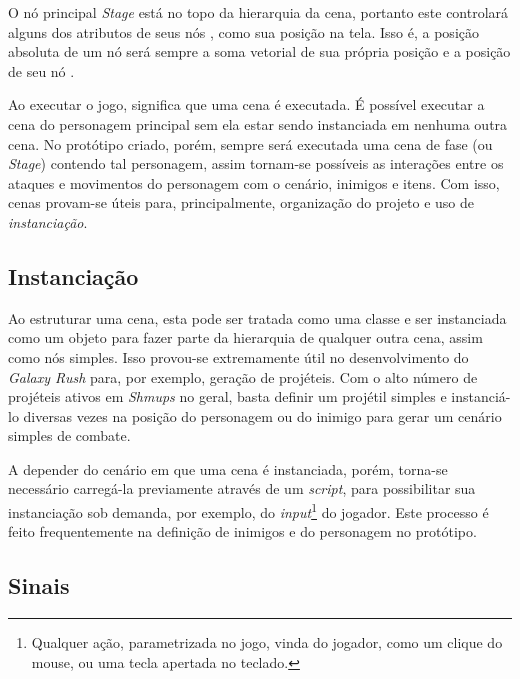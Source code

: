 O nó principal \textit{Stage} está no topo da hierarquia da cena, portanto este controlará alguns dos atributos de seus nós \textquotedbl{}, como sua posição na tela. Isso é, a posição absoluta de um nó será sempre a soma vetorial de sua própria posição e a posição de seu nó \textquotedbl{}.

Ao executar o jogo, significa que uma cena é executada. É possível executar a cena do personagem principal sem ela estar sendo instanciada em nenhuma outra cena. No protótipo criado, porém, sempre será executada uma cena de fase (ou \textit{Stage}) contendo tal personagem, assim tornam-se possíveis as interações entre os ataques e movimentos do personagem com o cenário, inimigos e itens. Com isso, cenas provam-se úteis para, principalmente, organização do projeto e uso de \textit{instanciação}.

\subsection{Instanciação}

Ao estruturar uma cena, esta pode ser tratada como uma classe e ser instanciada como um objeto para fazer parte da hierarquia de qualquer outra cena, assim como nós simples. Isso provou-se extremamente útil no desenvolvimento do \textit{Galaxy Rush} para, por exemplo, geração de projéteis. Com o alto número de projéteis ativos em \textit{Shmups} no geral, basta definir um projétil simples e instanciá-lo diversas vezes na posição do personagem ou do inimigo para gerar um cenário simples de combate.

A depender do cenário em que uma cena é instanciada, porém, torna-se necessário carregá-la previamente através de um \textit{script}, para possibilitar sua instanciação sob demanda, por exemplo, do \textit{input}\footnote{
    Qualquer ação, parametrizada no jogo, vinda do jogador, como um clique do mouse, ou uma tecla apertada no teclado.
} do jogador. Este processo é feito frequentemente na definição de inimigos e do personagem no protótipo.

\subsection{Sinais}

